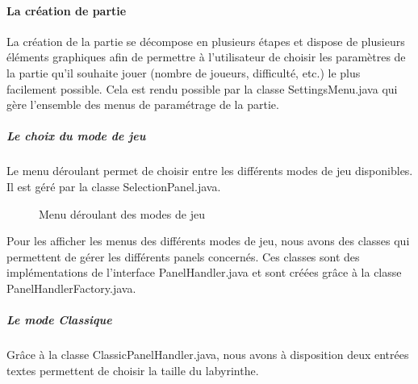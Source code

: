 \paragraph{La création de partie}

La création de la partie se décompose en plusieurs étapes et dispose de plusieurs éléments graphiques afin de permettre à l'utilisateur de choisir les paramètres de la partie qu'il souhaite jouer (nombre de joueurs, difficulté, etc.) le plus facilement possible. Cela est rendu possible par la classe SettingsMenu.java qui gère l'ensemble des menus de paramétrage de la partie.

\subparagraph*{Le choix du mode de jeu}

Le menu déroulant permet de choisir entre les différents modes de jeu disponibles. Il est géré par la classe SelectionPanel.java.

\begin{figure}
    \centering
    \caption{Menu déroulant des modes de jeu}
    \label{fig:ModeSelection}
\end{figure}

Pour les afficher les menus des différents modes de jeu, nous avons des classes qui permettent de gérer les différents panels concernés. Ces classes sont des implémentations de l'interface PanelHandler.java et sont créées grâce à la classe PanelHandlerFactory.java.

\subparagraph*{Le mode Classique}

Grâce à la classe ClassicPanelHandler.java, nous avons à disposition deux entrées textes permettent de choisir la taille du labyrinthe.

